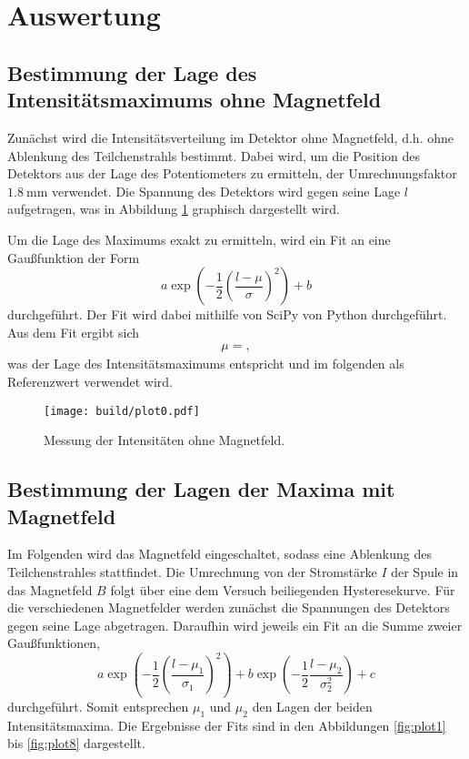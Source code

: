 \section{Auswertung}
\label{sec:Auswertung}
\subsection{Bestimmung der Lage des Intensitätsmaximums ohne Magnetfeld}

Zunächst wird die Intensitätsverteilung im Detektor ohne Magnetfeld, d.h. ohne Ablenkung des Teilchenstrahls bestimmt.
Dabei wird, um die Position des Detektors aus der Lage des Potentiometers zu ermitteln, der Umrechnungsfaktor $\SI{1.8}{\milli\metre}$ verwendet.
Die Spannung des Detektors wird gegen seine Lage $l$ aufgetragen, was in Abbildung \ref{fig:plot0} graphisch dargestellt wird.

Um die Lage des Maximums exakt zu ermitteln, wird ein Fit an eine Gaußfunktion der Form
\begin{equation}
  a \exp{\left( -\frac{1}{2} \left( \frac{l - \mu}{\sigma}\right)^2 \right)} + b
\end{equation}
durchgeführt.
Der Fit wird dabei mithilfe von SciPy von Python durchgeführt.
Aus dem Fit ergibt sich
\begin{align*}
  \mu = ,
\end{align*}
was der Lage des Intensitätsmaximums entspricht und im folgenden als Referenzwert verwendet wird.
\begin{figure}
  \centering
  \texttt{[image: build/plot0.pdf]}
  \caption{Messung der Intensitäten ohne Magnetfeld.}
  \label{fig:plot0}
\end{figure}

\subsection{Bestimmung der Lagen der Maxima mit Magnetfeld}
Im Folgenden wird das Magnetfeld eingeschaltet, sodass eine Ablenkung des Teilchenstrahles stattfindet.
Die Umrechnung von der Stromstärke $I$ der Spule in das Magnetfeld $B$ folgt über eine dem Versuch beiliegenden Hysteresekurve.
Für die verschiedenen Magnetfelder werden zunächst die Spannungen des Detektors gegen seine Lage abgetragen.
Daraufhin wird jeweils ein Fit an die Summe zweier Gaußfunktionen,
\begin{equation}
  a \exp{\left( -\frac{1}{2} \left(\frac{l - \mu_1}{\sigma_1}\right)^2 \right)} +  b \exp{\left( -\frac{1}{2} \frac{l - \mu_2}{\sigma_2^2} \right)} + c
\end{equation}
durchgeführt.
Somit entsprechen $\mu_1$ und $\mu_2$ den Lagen der beiden Intensitätsmaxima.
Die Ergebnisse der Fits sind in den Abbildungen \ref{fig:plot1} bis \ref{fig:plot8} dargestellt.

